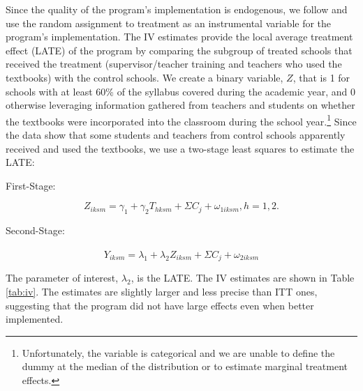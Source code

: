 Since the quality of the program's implementation is endogenous, we follow \cite{frisancho2020impact} and use the random assignment to treatment as an instrumental variable for the program's implementation.
The IV estimates provide the local average treatment effect (LATE) of the program by comparing the subgroup of treated schools that received the treatment (supervisor/teacher training and teachers who used the textbooks) with the control schools. We create a binary variable, $Z$, that is 1 for schools with at least 60\% of the syllabus covered during the academic year, and 0 otherwise leveraging information gathered from teachers and students on whether the textbooks were incorporated into the classroom during the school year.\footnote{Unfortunately, the variable is categorical and we are unable to define the dummy at the median of the distribution or to estimate marginal treatment effects.} Since the data show that some students and teachers from control schools apparently received and used the textbooks, we use a two-stage least squares to estimate the LATE:


First-Stage: \vspace{-50pt}

\begin{equation}
     Z_{iksm}= \gamma_{1} + \gamma_{2} T_{hksm} + \Sigma{C_j} + \omega_{1iksm},  h = 1, 2. 
     \label{eq:Y2}
\end{equation}

Second-Stage:\vspace{-50pt}

\begin{equation}
    Y_{iksm}= \lambda_{1} + \lambda_{2} \widehat{Z_{iksm}} + \Sigma{C_j} + \omega_{2iksm} 
    \label{eq:Y3} 
\end{equation}

The parameter of interest, $\lambda_2$, is the LATE. The IV estimates are shown in Table \ref{tab:iv}. The estimates 
are slightly larger and less precise than ITT ones, suggesting that the program did not have large effects even when better implemented.   
\vspace{10 pt}

